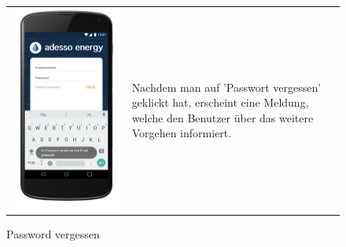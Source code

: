 \begin{figure}[h]
\begin{tabularx}{\textwidth}{X  X}
	\includegraphics[scale = 0.155]{img/AndroidMockup/forgotPassword} \caption{Password vergessen} & Nachdem man auf 'Passwort vergessen' geklickt hat, erscheint eine Meldung, welche den Benutzer über das weitere Vorgehen informiert.\\

\end{tabularx}
\end{figure}
